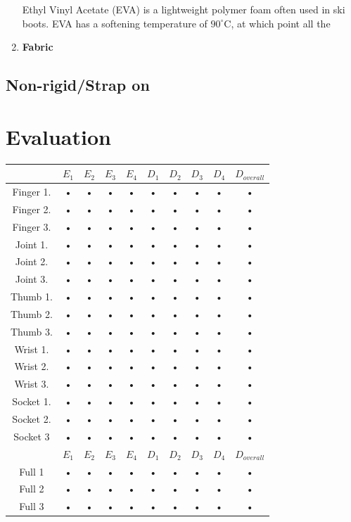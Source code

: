 \documentclass[12pt,3p]{report}
\begin{document}
\begin{multicols}{2}
\begin{enumerate}
{		Ethyl Vinyl Acetate (EVA) is a lightweight polymer foam often used in ski boots. EVA has a softening temperature of $90^{\circ}$C, at which point all the 
		}
		\item \textbf{Fabric} {
		
		
		}
		\end{enumerate}
		
		\subsection{Non-rigid/Strap on}
		
				\pagebreak
			\end{multicols}	
	\section{Evaluation}
\begin{tabular}{|c|c|c|c|c|c|c|c|c||c|}
\hline 
 & $E_1$ & $E_2$ & $E_3$ & $E_4$ & $D_1$ & $D_2$ & $D_3$ & $D_4$ & $D_{overall}$ \\ 
\hline 
Finger 1. & • & • & • & • & • & • & • & • & •\\ 
\hline 
Finger 2. & • & • & • & • & • & • & • & • & •\\ 
\hline 
Finger 3. & • & • & • & • & • & • & • & • & •\\ 
\hline 
Joint 1. & • & • & • & • & • & • & • & • & •\\ 
\hline 
Joint 2. & • & • & • & • & • & • & • & • & •\\ 
\hline 
Joint 3. & • & • & • & • & • & • & • & • & •\\ 
\hline 
Thumb 1. & • & • & • & • & • & • & • & • & •\\ 
\hline 
Thumb 2. & • & • & • & • & • & • & • & • & •\\ 
\hline 
Thumb 3. & • & • & • & • & • & • & • & • & •\\ 
\hline 
Wrist 1. & • & • & • & • & • & • & • & • & •\\ 
\hline 
Wrist 2. & • & • & • & • & • & • & • & • & •\\ 
\hline 
Wrist 3. & • & • & • & • & • & • & • & • & •\\ 
\hline 
Socket 1. & • & • & • & • & • & • & • & • & •\\ 
\hline 
Socket 2. & • & • & • & • & • & • & • & • & •\\ 
\hline 
Socket 3 & • & • & • & • & • & • & • & • & •\\
\hline
\hline 
 & $E_1$ & $E_2$ & $E_3$ & $E_4$ & $D_1$ & $D_2$ & $D_3$ & $D_4$ & $D_{overall}$ \\
\hline 
Full 1 & • & • & • & • & • & • & • & • & • \\ 
\hline 
Full 2 & • & • & • & • & • & • & • & • & • \\ 
\hline 
Full 3 & • & • & • & • & • & • & • & • & • \\ 
\hline 
\end{tabular} 
\end{document}
